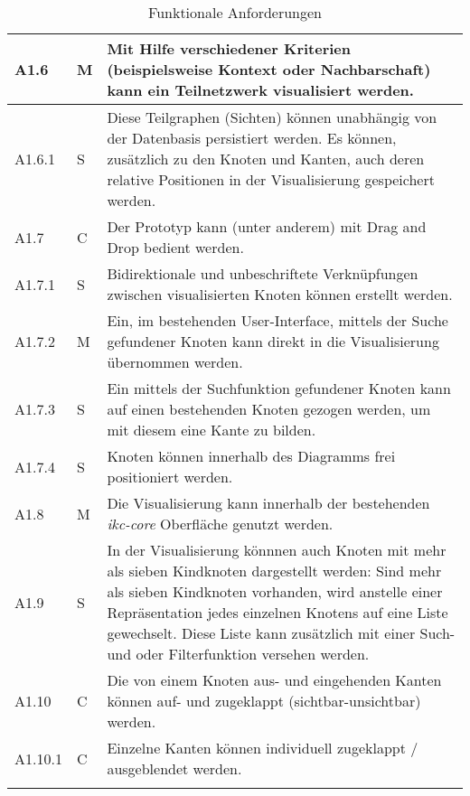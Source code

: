 \begin{longtable}{|p{1.5cm} | p{1.5cm} | p{8.1cm}|}
    A1.6 & M & Mit Hilfe verschiedener Kriterien (beispielsweise Kontext oder Nachbarschaft) kann ein Teilnetzwerk visualisiert werden.\\\hline 
    A1.6.1 & S & Diese Teilgraphen (Sichten) können unabhängig von der Datenbasis persistiert werden. Es können, zusätzlich zu den Knoten und Kanten, auch deren relative Positionen in der Visualisierung gespeichert werden.\\\hline 
    A1.7 & C & Der Prototyp kann (unter anderem) mit Drag and Drop bedient werden.\\\hline
    A1.7.1 & S & Bidirektionale und unbeschriftete Verknüpfungen zwischen visualisierten Knoten können erstellt werden.\\\hline
    A1.7.2 & M & Ein, im bestehenden User-Interface, mittels der Suche gefundener Knoten kann direkt in die Visualisierung übernommen werden.\\\hline 
    A1.7.3 & S & Ein mittels der Suchfunktion gefundener Knoten kann auf einen bestehenden Knoten gezogen werden, um mit diesem eine Kante zu bilden.\\\hline 
    A1.7.4 & S & Knoten können innerhalb des Diagramms frei positioniert werden.\\\hline 
    A1.8 & M & Die Visualisierung kann innerhalb der bestehenden \textit{ikc-core} Oberfläche genutzt werden.\\\hline 
    A1.9 & S & In der Visualisierung könnnen auch Knoten mit mehr als sieben Kindknoten dargestellt werden: Sind mehr als sieben Kindknoten vorhanden, wird anstelle einer Repräsentation jedes einzelnen Knotens auf eine Liste gewechselt. Diese Liste kann zusätzlich mit einer Such- und oder Filterfunktion versehen werden.\\\hline  
    A1.10 & C & Die von einem Knoten aus- und eingehenden Kanten können auf- und zugeklappt (sichtbar-unsichtbar) werden.\\\hline
    A1.10.1 & C & Einzelne Kanten können individuell zugeklappt / ausgeblendet werden.\\\hline
     
    \caption{Funktionale Anforderungen}
  \label{tab:funktionale-anforderungen}
\end{longtable}

